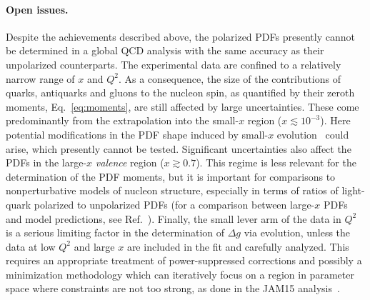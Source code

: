 
\paragraph{Open issues.}

Despite the achievements described above, the polarized PDFs presently cannot 
be determined in a global QCD analysis with the same accuracy as their 
unpolarized counterparts.
%
The experimental data are confined to a relatively narrow range of 
$x$ and $Q^2$.
%
As a consequence, the size of the contributions of quarks, antiquarks and 
gluons to the nucleon spin, as quantified by their zeroth moments, 
Eq.~\eqref{eq:moments}, are still affected by large uncertainties. 
%
These come predominantly from the extrapolation into the small-$x$ region 
($x\lesssim 10^{-3}$). 
%
Here potential modifications in the PDF shape induced by small-$x$ 
evolution~\cite{Bartels:1995iu,Bartels:1996wc,Kovchegov:2015pbl,
Kovchegov:2016weo,Kovchegov:2016zex,Kovchegov:2017jxc,Kovchegov:2017lsr} 
could arise, which presently cannot be tested.
%
Significant uncertainties also affect the PDFs in the large-$x$ 
{\it valence} region ($x\gtrsim 0.7$). 
%
This regime is less relevant for the determination of the PDF moments, but it 
is important for comparisons to nonperturbative models of nucleon structure, 
especially in terms of ratios of light-quark polarized to unpolarized PDFs 
(for a comparison between large-$x$ PDFs 
and model predictions, see Ref.~\cite{Nocera:2014uea}).
%
Finally, the small lever arm of the data in $Q^2$ is a serious limiting factor 
in the determination of $\Delta g$ via evolution, unless the data at low $Q^2$
and large $x$ are included in the fit and carefully analyzed.
%
This requires an appropriate treatment of power-suppressed corrections and 
possibly a minimization methodology which can iteratively focus on a region 
in parameter space where constraints are not too strong, as done in the 
JAM15 analysis~\cite{Sato:2016tuz}. 

